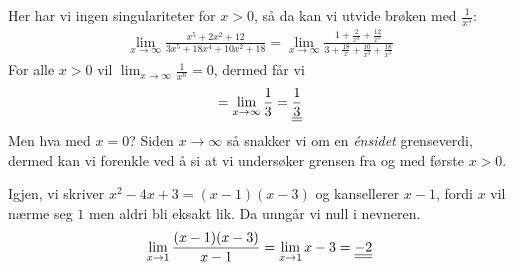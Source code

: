 \documentclass[a4paper,norsk,12pt]{article}
\begin{document}
Her har vi ingen singulariteter for $x>0$, så da kan vi utvide brøken med
$\frac{1}{x^5}$:
\begin{equation*}
\begin{split}
  \lim_{x \to \infty}{\frac{x^5+2x^2+12}{3x^5+18x^4+10x^2+18}} =
    \lim_{x \to \infty}{
        \frac{
          1+\frac{2}{x^3}+\frac{12}{x^5}
        }{
          3+\frac{18}{x}+\frac{10}{x^3}+\frac{18}{x^5}
      }}
\end{split}
\end{equation*}
For alle $x>0$ vil $\lim_{x \to \infty}{\frac{1}{x^n}} = 0$, dermed får vi
\begin{equation*}
\begin{split}
  = \lim_{x \to \infty}{\frac{1}{3}} = {\underline{\underline{\frac{1}{3}}}}
\end{split}
\end{equation*}
Men hva med $x=0$? Siden $x\to\infty$ så snakker vi om en \textit{énsidet}
grenseverdi, dermed kan vi forenkle ved å si at vi undersøker grensen fra og
med første $x>0$.

Igjen, vi skriver $x^2-4x+3 = (x-1)(x-3)$ og kansellerer $x-1$, fordi $x$ vil
nærme seg $1$ men aldri bli eksakt lik. Da unngår vi null i nevneren.
\begin{equation*}
\begin{split}
  \lim_{x \to 1}{\frac{(x-1)(x-3)}{x-1}} =
  \lim_{x \to 1}{x-3} = {\underline{\underline{-2}}}
\end{split}
\end{equation*}
\end{document}
